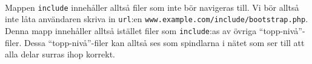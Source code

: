 \documentclass[12pt]{article}
\begin{document}
\paragraph{}
Mappen \texttt{include} innehåller alltså filer som inte bör navigeras till. Vi bör alltså inte låta användaren skriva in \texttt{url}:en \texttt{www.example.com/include/bootstrap.php}. Denna mapp innehåller alltså istället filer som \texttt{include}:as av övriga ``topp-nivå''-filer. Dessa ``topp-nivå''-filer kan alltså ses som spindlarna i nätet som ser till att alla delar surras ihop korrekt.
\end{document}
